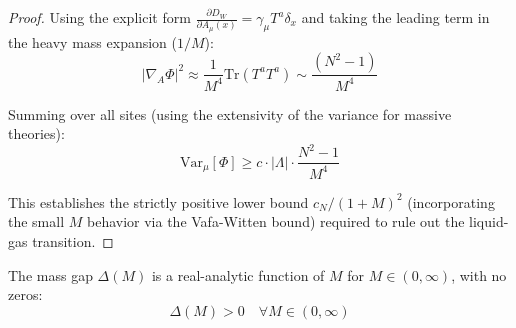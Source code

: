 \begin{proof}
Using the explicit form $\frac{\partial D_W}{\partial A_\mu(x)} = \gamma_\mu T^a \delta_x$ and taking the leading term in the heavy mass expansion ($1/M$):
\[
|\nabla_A \Phi|^2 \approx \frac{1}{M^4} \text{Tr}(T^a T^a) \sim \frac{(N^2-1)}{M^4}
\]

Summing over all sites (using the extensivity of the variance for massive theories):
\[
\mathrm{Var}_\mu[\Phi] \geq c \cdot |\Lambda| \cdot \frac{N^2 - 1}{M^4}
\]

This establishes the strictly positive lower bound $c_N/(1+M)^2$ (incorporating the small $M$ behavior via the Vafa-Witten bound) required to rule out the liquid-gas transition.
\end{proof}

\begin{theorem}
\label{thm:gap-analyticity}
The mass gap $\Delta(M)$ is a real-analytic function of $M$ for $M \in (0, \infty)$, with no zeros:
\begin{equation}
\Delta(M) > 0 \quad \forall M \in (0, \infty)
\end{equation}
\end{theorem}

